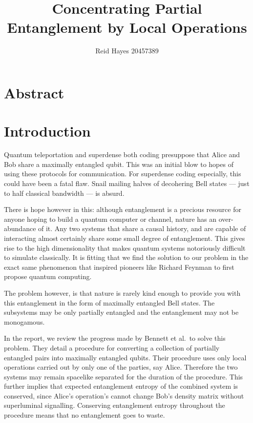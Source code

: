 \documentclass[12pt,letterpaper]{article}
\author{Reid Hayes 20457389}
\title{Concentrating Partial Entanglement by Local Operations}
\begin{document}
\maketitle
\section{Abstract}
\section{Introduction}
Quantum teleportation and superdense both coding presuppose that Alice and Bob share a maximally entangled qubit. 
This was an initial blow to hopes of using these protocols for communication.
For superdense coding especially, this could have been a fatal flaw.
Snail mailing halves of decohering Bell states --- just to half classical bandwidth --- is absurd.

There is hope however in this: although entanglement is a precious resource for anyone hoping to build a quantum computer or channel, nature has an over-abundance of it. 
Any two systems that share a causal history, and are capable of interacting almost certainly share some small degree of entanglement.
This gives rise to the high dimensionality that makes quantum systems notoriously difficult to simulate classically.
It is fitting that we find the solution to our problem in the exact same phenomenon that inspired pioneers like Richard Feynman to first propose quantum computing.

The problem however, is that nature is rarely kind enough to provide you with this entanglement in the form of maximally entangled Bell states.
The subsystems may be only partially entangled and the entanglement may not be monogamous.

In the report, we review the progress made by Bennett et al.\ to solve this problem.
They detail a procedure for converting a collection of partially entangled pairs into maximally entangled qubits.
Their procedure uses only local operations carried out by only one of the parties, say Alice. Therefore the two systems may remain spacelike separated for the duration of the procedure.
This further implies that expected entanglement entropy of the combined system is conserved, since Alice's operation's cannot change Bob's density matrix without superluminal signalling. Conserving entanglement entropy throughout the procedure means that no entanglement goes to waste.
\end{document}
